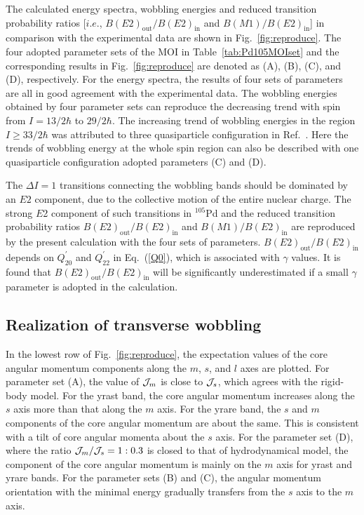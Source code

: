 \documentclass[aps,prc,preprint,showpacs,groupedaddress,floatfix,amsmath,amssymb]{revtex4-1}
\begin{document}
The calculated energy spectra, wobbling energies and reduced transition probability ratios [$i.e.$, $B(E2)_{\textrm{out}}/B(E2)_{\textrm{in}}$ and $B(M1)/B(E2)_{\textrm{in}}$]  in comparison with the experimental data are shown in Fig.~\ref{fig:reproduce}.
The four adopted parameter sets of the MOI in Table~\ref{tab:Pd105MOIset} and the corresponding results in Fig.~\ref{fig:reproduce} are denoted as (A), (B), (C), and (D), respectively.
For the energy spectra, the results of four sets of parameters are all in good agreement with the experimental data. The wobbling energies obtained by four parameter sets can reproduce the decreasing trend with spin from $I=13/2\hbar$ to $29/2\hbar$. The increasing trend of wobbling energies in the region $I \geq 33/2\hbar$ was attributed to three quasiparticle configuration in Ref.~\cite{Pd105}. Here the trends of wobbling energy at the whole spin region can also be described with one quasiparticle configuration adopted parameters (C) and (D).

The $\Delta I=1$ transitions connecting the wobbling bands should be dominated by an $E2$ component, due to the collective motion of the entire nuclear charge.
The strong $E$2 component of such transitions in $^{105}$Pd and the reduced transition probability ratios $B(E2)_{\textrm{out}}/B(E2)_{\textrm{in}}$ and $B(M1)/B(E2)_{\textrm{in}}$ are reproduced by the present calculation with the four sets of parameters. $B(E2)_{\textrm{out}}/B(E2)_{\textrm{in}}$ depends on $Q^{'}_{20}$ and $Q^{'}_{22}$ in Eq.~(\ref{Q0}), which is associated with $\gamma$ values.  It is found that $B(E2)_{\textrm{out}}/B(E2)_{\textrm{in}}$ will be significantly underestimated if a small $\gamma$ parameter is adopted in the calculation.


\subsection{Realization of transverse wobbling}

In the lowest row of  Fig.~\ref{fig:reproduce}, the expectation values of the core angular momentum components along the $m$, $s$, and $l$ axes are plotted. For parameter set (A), the value of ${\cal J}_m$ is close to ${\cal J}_s$, which agrees with the rigid-body model. For the yrast band, the core angular momentum increases along the $s$ axis more than that along the $m$ axis. For the yrare band, the $s$ and $m$ components of the core angular momentum are about the same. This is consistent with a tilt of core angular momenta about the $s$ axis.
For the parameter set (D), where the ratio ${\cal J}_m/{\cal J}_s=1:0.3$ is closed to that of hydrodynamical model, the component of the core angular momentum  is mainly on the $m$ axis for yrast and yrare bands. For the parameter sets (B) and (C), the angular momentum orientation with the minimal energy gradually transfers from the $s$ axis to the $m$ axis.
\end{document}
